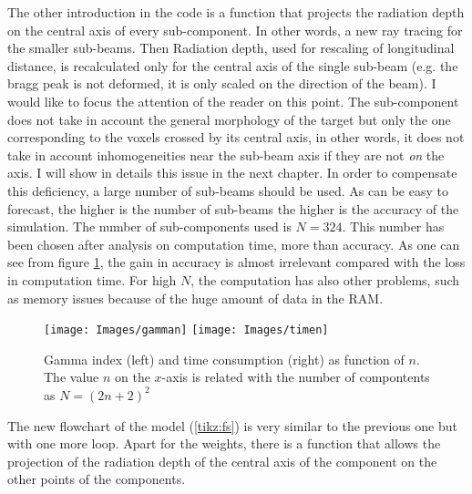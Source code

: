 \documentclass[12pt, a4paper, twoside]{book}
\begin{document}


The other introduction in the code is a function that projects the radiation depth on the central axis of every sub-component. In other words, a new ray tracing for the smaller sub-beams.
Then Radiation depth, used for rescaling of longitudinal distance, is recalculated only for the central axis of the single sub-beam (e.g. the bragg peak is not deformed, it is only scaled on the direction of the beam). I would like to focus the attention of the reader on this point. The sub-component does not take in account the general morphology of the target but only the one corresponding to the voxels crossed by its central axis, in other words, it does not take in account inhomogeneities near the sub-beam axis if they are not \emph{on} the axis. I will show in details this issue in the next chapter. 
In order to compensate this deficiency, a large number of sub-beams should be used. 
As can be easy to forecast, the higher is the number of sub-beams the higher is the accuracy of the simulation. 
The number of sub-components used is $N=324$. This number has been chosen after analysis on computation time, more than accuracy. As one can see from figure \ref{fig:gausn}, the gain in accuracy is almost irrelevant compared with the loss in computation time. For high $N$, the computation has also other problems, such as memory issues because of the huge amount of data in the RAM.
\begin{figure}[t]
{\texttt{[image: Images/gamman]}}
{\texttt{[image: Images/timen]}}
\caption{Gamma index (left) and time consumption (right) as function of $n$. The value $n$ on the $x$-axis is related with the number of compontents as $N=(2n+2)^2$}
\label{fig:gausn}
\end{figure}

The new flowchart of the model (\ref{tikz:fs}) is very similar to the previous one but with one more loop.
Apart for the weights, there is a function that allows the projection of the radiation depth of the central axis of the component on the other points of the components.
\end{document}
